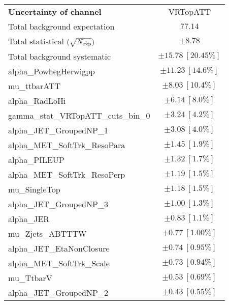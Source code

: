 
\begin{table}
\begin{center}
\setlength{\tabcolsep}{0.0pc}
\begin{tabular*}{\textwidth}{@{\extracolsep{\fill}}lc}
\noalign{\smallskip}\hline\noalign{\smallskip}
{\bf Uncertainty of channel}                                    & VRTopATT            \\
\noalign{\smallskip}\hline\noalign{\smallskip}
Total background expectation             &  $77.14$       \\
\noalign{\smallskip}\hline\noalign{\smallskip}
Total statistical $(\sqrt{N_{\rm exp}})$              & $\pm 8.78$       \\
Total background systematic               & $\pm 15.78\ [20.45\%] $             \\
\noalign{\smallskip}\hline\noalign{\smallskip}
\noalign{\smallskip}\hline\noalign{\smallskip}
alpha\_PowhegHerwigpp         & $\pm 11.23\ [14.6\%] $       \\
mu\_ttbarATT         & $\pm 8.03\ [10.4\%] $       \\
alpha\_RadLoHi         & $\pm 6.14\ [8.0\%] $       \\
gamma\_stat\_VRTopATT\_cuts\_bin\_0         & $\pm 3.24\ [4.2\%] $       \\
alpha\_JET\_GroupedNP\_1         & $\pm 3.08\ [4.0\%] $       \\
alpha\_MET\_SoftTrk\_ResoPara         & $\pm 1.45\ [1.9\%] $       \\
alpha\_PILEUP         & $\pm 1.32\ [1.7\%] $       \\
alpha\_MET\_SoftTrk\_ResoPerp         & $\pm 1.19\ [1.5\%] $       \\
mu\_SingleTop         & $\pm 1.18\ [1.5\%] $       \\
alpha\_JET\_GroupedNP\_3         & $\pm 1.00\ [1.3\%] $       \\
alpha\_JER         & $\pm 0.83\ [1.1\%] $       \\
mu\_Zjets\_ABTTTW         & $\pm 0.77\ [1.00\%] $       \\
alpha\_JET\_EtaNonClosure         & $\pm 0.74\ [0.95\%] $       \\
alpha\_MET\_SoftTrk\_Scale         & $\pm 0.73\ [0.94\%] $       \\
mu\_TtbarV         & $\pm 0.53\ [0.69\%] $       \\
alpha\_JET\_GroupedNP\_2         & $\pm 0.43\ [0.55\%] $       \\

\end{tabular*}
\end{center}
\end{table}
